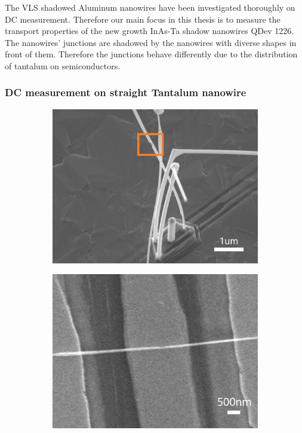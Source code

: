 The VLS shadowed Aluminum nanowires have been investigated thoroughly on DC measurement\cite{RN38}. Therefore our main focus in this thesis is to measure the transport properties of the new growth InAs-Ta shadow nanowires QDev 1226. The nanowires' junctions are shadowed by the nanowires with diverse shapes in front of them. Therefore the junctions behave differently due to the distribution of tantalum on semiconductors. 

\subsubsection{DC measurement on straight Tantalum nanowire}
\begin{figure}[h!]
    \centering
    \begin{subfigure}[b]{0.48\textwidth}
         \centering
         \includegraphics[width=\textwidth]{Pic/NW2_SEM_zero.jpg}
         \caption{}
         \label{}
     \end{subfigure}
     \hfill
     \begin{subfigure}[b]{0.48\textwidth}
         \centering
         \includegraphics[width=\textwidth]{Pic/NW2_SEM_first.jpg}

\end{subfigure}
\end{figure}
